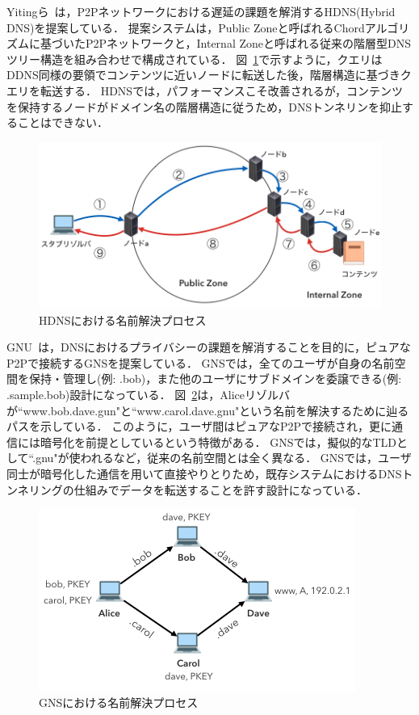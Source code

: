 Yitingら~\cite{yiting}は，P2Pネットワークにおける遅延の課題を解消するHDNS(Hybrid DNS)を提案している．
提案システムは，Public Zoneと呼ばれるChordアルゴリズムに基づいたP2Pネットワークと，Internal Zoneと呼ばれる従来の階層型DNSツリー構造を組み合わせで構成されている．
図~\ref{fig:hdns-mechanism}で示すように，クエリはDDNS同様の要領でコンテンツに近いノードに転送した後，階層構造に基づきクエリを転送する．
HDNSでは，パフォーマンスこそ改善されるが，コンテンツを保持するノードがドメイン名の階層構造に従うため，DNSトンネリンを抑止することはできない．
\begin{figure}[htbp]
 \centering
 \includegraphics[scale=0.5]{figure/hdns-mechanism.png}
 \caption{HDNSにおける名前解決プロセス}
 \label{fig:hdns-mechanism}
\end{figure}

GNU~\cite{gns}は，DNSにおけるプライバシーの課題を解消することを目的に，ピュアなP2Pで接続するGNSを提案している．
GNSでは，全てのユーザが自身の名前空間を保持・管理し(例: .bob)，また他のユーザにサブドメインを委譲できる(例: .sample.bob)設計になっている．
図~\ref{fig:gns-resolution}は，Aliceリゾルバが``www.bob.dave.gun"と``www.carol.dave.gnu"という名前を解決するために辿るパスを示している．
このように，ユーザ間はピュアなP2Pで接続され，更に通信には暗号化を前提としているという特徴がある．
GNSでは，擬似的なTLDとして``.gnu"が使われるなど，従来の名前空間とは全く異なる．
GNSでは，ユーザ同士が暗号化した通信を用いて直接やりとりため，既存システムにおけるDNSトンネリングの仕組みでデータを転送することを許す設計になっている．
\begin{figure}[htbp]
 \centering
 \includegraphics[scale=0.6]{figure/gns-resolution.png}
 \caption{GNSにおける名前解決プロセス}
 \label{fig:gns-resolution}
\end{figure}
